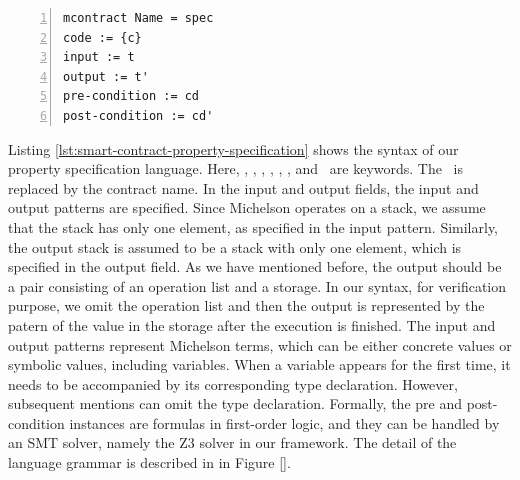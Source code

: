 \documentclass[a4paper,UKenglish,cleveref, autoref, thm-restate]{lipics-v2021}
\begin{document}
\begin{lstlisting}[float,captionpos=b,caption={Smart contract property specification},label={lst:smart-contract-property-specification},numbers=left]
mcontract Name = spec
code := {c}
input := t
output := t'
pre-condition := cd
post-condition := cd'
\end{lstlisting}
Listing \ref{lst:smart-contract-property-specification} shows the syntax of our property specification language. Here, \KMCONTRACT, \KWITH, \KCODE, \KINPUT, \KOUTPUT, \KPRECONDI, and \KPOSTCONDI\ are keywords. The \KNAME\ is replaced by the contract name. In the input and output fields, the input and output patterns are specified. Since Michelson operates on a stack, we assume that the stack has only one element, as specified in the input pattern. Similarly, the output stack is assumed to be a stack with only one element, which is specified in the output field. As we have mentioned before, the output should be a pair consisting of an operation list and a storage. In our syntax, for verification purpose, we omit the operation list and then the output is represented by the patern of the value in the storage after the execution is finished. The input and output patterns represent Michelson terms, which can be either concrete values or symbolic values, including variables. When a variable appears for the first time, it needs to be accompanied by its corresponding type declaration. However, subsequent mentions can omit the type declaration. Formally, the pre and post-condition instances are formulas in first-order logic, and they can be handled by an SMT solver, namely the Z3 solver in our framework. The detail of the language grammar is described in in Figure \ref{}. 
\end{document}
